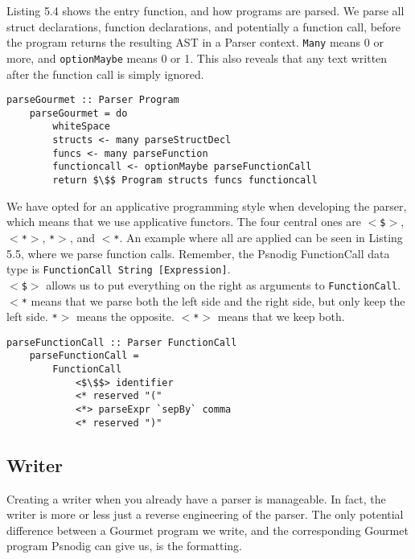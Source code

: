 Listing 5.4 shows the entry function, and how programs are parsed. We parse all struct declarations, function declarations, and potentially a function call, before the program returns the resulting AST in a Parser context. \texttt{Many} means 0 or more, and \texttt{optionMaybe} means 0 or 1. This also reveals that any text written after the function call is simply ignored. \hfill \\

\begin{lstlisting}[caption={Parsing Gourmet programs}, captionpos=b]
    parseGourmet :: Parser Program
    parseGourmet = do
        whiteSpace
        structs <- many parseStructDecl
        funcs <- many parseFunction
        functioncall <- optionMaybe parseFunctionCall
        return $\$$ Program structs funcs functioncall
\end{lstlisting}

We have opted for an applicative programming style when developing the parser, which means that we use applicative functors. The four central ones are \texttt{$<$\$$>$}, \texttt{$<$*$>$}, \texttt{*$>$}, and \texttt{$<$*}. An example where all are applied can be seen in Listing 5.5, where we parse function calls. Remember, the Psnodig FunctionCall data type is \texttt{FunctionCall String [Expression]}. \hfill \\

\texttt{$<$\$$>$} allows us to put everything on the right as arguments to \texttt{FunctionCall}. \texttt{$<$*} means that we parse both the left side and the right side, but only keep the left side. \texttt{*$>$} means the opposite. \texttt{$<$*$>$} means that we keep both. \hfill \\

\begin{lstlisting}[caption={Parsing Gourmet function calls}, captionpos=b]
    parseFunctionCall :: Parser FunctionCall
    parseFunctionCall =
        FunctionCall
            <$\$$> identifier
            <* reserved "("
            <*> parseExpr `sepBy` comma
            <* reserved ")"
\end{lstlisting}

\subsection{Writer}

Creating a writer when you already have a parser is manageable. In fact, the writer is more or less just a reverse engineering of the parser. The only potential difference between a Gourmet program we write, and the corresponding Gourmet program Psnodig can give us, is the formatting. \hfill \\

